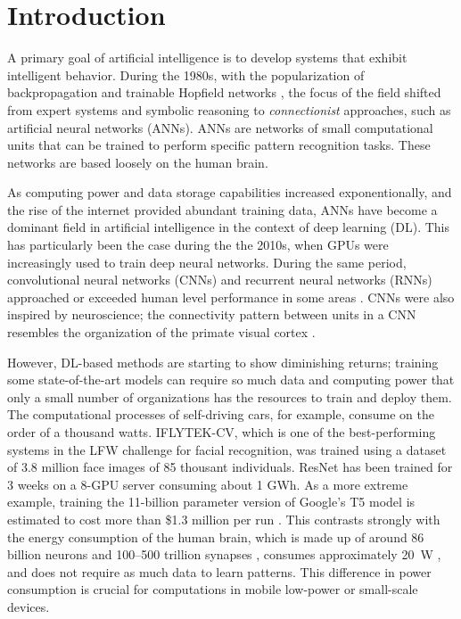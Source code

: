 \chapter{Introduction}\label{ch:introduction}

A primary goal of artificial intelligence is to develop systems that exhibit intelligent behavior.
During the 1980s, with the popularization of backpropagation \citep{rumelhart1986learning} and trainable Hopfield networks \citep{hopfield1982neural}, the focus of the field shifted from expert systems and symbolic reasoning to \emph{connectionist} approaches, such as artificial neural networks (ANNs).
ANNs are networks of small computational units that can be trained to perform specific pattern recognition tasks.
These networks are based loosely on the human brain.

As computing power and data storage capabilities increased exponentionally, and the rise of the internet provided abundant training data, ANNs have become a dominant field in artificial intelligence in the context of deep learning (DL).
This has particularly been the case during the the 2010s, when GPUs were increasingly used to train deep neural networks.
During the same period, convolutional neural networks (CNNs) and recurrent neural networks (RNNs) approached or exceeded human level performance in some areas \citep{schmidhuber2015deep}.
CNNs were also inspired by neuroscience; the connectivity pattern between units in a CNN resembles the organization of the primate visual cortex \citep{hubel1968receptive}.

However, DL-based methods are starting to show diminishing returns; training some state-of-the-art models can require so much data and computing power that only a small number of organizations has the resources to train and deploy them.
The computational processes of self-driving cars, for example, consume on the order of a thousand watts.
IFLYTEK-CV, which is one of the best-performing systems in the LFW challenge for facial recognition, was trained using a dataset of 3.8 million face images of 85 thousant individuals.
ResNet  has been trained for 3 weeks on a 8-GPU server  consuming about 1 GWh. 
As a more extreme example, training the 11-billion parameter version of Google's T5 model \citep{raffel2019exploring} is estimated to cost more than \$1.3 million per run \citep{sharir2020cost}.
This contrasts strongly with the energy consumption of the human brain, which is made up of around 86 billion neurons \citep{azevedo2009equal} and 100--500 trillion synapses \citep{drachman2005we}, consumes approximately \SI{20}{\watt} \citep{sokoloff1960metabolism,drubach2000brain}, and does not require as much data to learn patterns.
This difference in power consumption is crucial for computations in mobile low-power or small-scale devices.

